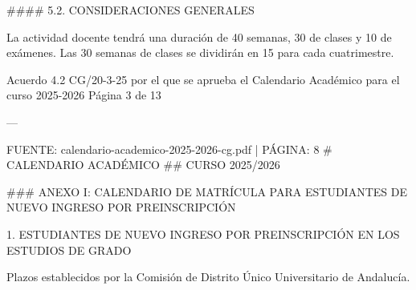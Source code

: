 \documentclass{article}
\begin{document}
\begin{itemize}
\begin{itemize}
\begin{scriptsize}
                  \#\#\#\# 5.2. CONSIDERACIONES GENERALES

                  La actividad docente tendrá una duración de 40 semanas, 30 de clases y 10 de exámenes. Las 30 semanas de clases se dividirán en 15 para cada cuatrimestre.

                  Acuerdo 4.2 CG/20-3-25 por el que se aprueba el Calendario Académico para el curso 2025-2026  Página 3 de 13

                  ---

                  FUENTE: calendario-academico-2025-2026-cg.pdf | PÁGINA: 8
                  \# CALENDARIO ACADÉMICO
                  \#\# CURSO 2025/2026

                  \#\#\# ANEXO I: CALENDARIO DE MATRÍCULA PARA ESTUDIANTES DE NUEVO INGRESO POR PREINSCRIPCIÓN

                  1. ESTUDIANTES DE NUEVO INGRESO POR PREINSCRIPCIÓN EN LOS ESTUDIOS DE GRADO

                  Plazos establecidos por la Comisión de Distrito Único Universitario de Andalucía.


\end{scriptsize}
\end{itemize}
\end{itemize}
\end{document}
